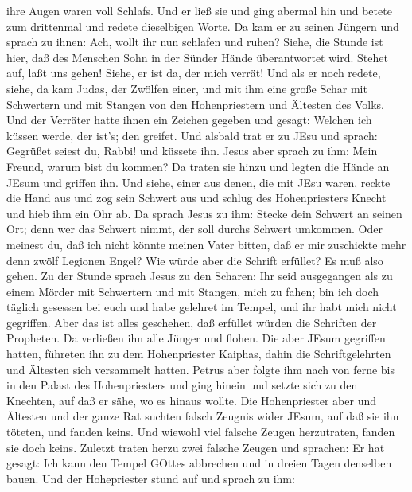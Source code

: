 ihre Augen waren voll Schlafs.  Und er ließ sie und ging
abermal hin und betete zum drittenmal und redete dieselbigen Worte.
 Da kam er zu seinen Jüngern und sprach zu ihnen: Ach,
wollt ihr nun schlafen und ruhen? Siehe, die Stunde ist hier, daß des
Menschen Sohn in der Sünder Hände überantwortet wird. 
Stehet auf, laßt uns gehen! Siehe, er ist da, der mich verrät!
 Und als er noch redete, siehe, da kam Judas, der Zwölfen
einer, und mit ihm eine große Schar mit Schwertern und mit Stangen von
den Hohenpriestern und Ältesten des Volks.  Und der
Verräter hatte ihnen ein Zeichen gegeben und gesagt: Welchen ich küssen
werde, der ist's; den greifet.  Und alsbald trat er zu JEsu
und sprach: Gegrüßet seiest du, Rabbi! und küssete ihn. 
Jesus aber sprach zu ihm: Mein Freund, warum bist du kommen? Da traten
sie hinzu und legten die Hände an JEsum und griffen ihn. 
Und siehe, einer aus denen, die mit JEsu waren, reckte die Hand aus und
zog sein Schwert aus und schlug des Hohenpriesters Knecht und hieb ihm
ein Ohr ab.  Da sprach Jesus zu ihm: Stecke dein Schwert an
seinen Ort; denn wer das Schwert nimmt, der soll durchs Schwert
umkommen.  Oder meinest du, daß ich nicht könnte meinen
Vater bitten, daß er mir zuschickte mehr denn zwölf Legionen Engel?
 Wie würde aber die Schrift erfüllet? Es muß also gehen.
 Zu der Stunde sprach Jesus zu den Scharen: Ihr seid
ausgegangen als zu einem Mörder mit Schwertern und mit Stangen, mich zu
fahen; bin ich doch täglich gesessen bei euch und habe gelehret im
Tempel, und ihr habt mich nicht gegriffen.  Aber das ist
alles geschehen, daß erfüllet würden die Schriften der Propheten. Da
verließen ihn alle Jünger und flohen.  Die aber JEsum
gegriffen hatten, führeten ihn zu dem Hohenpriester Kaiphas, dahin die
Schriftgelehrten und Ältesten sich versammelt hatten. 
Petrus aber folgte ihm nach von ferne bis in den Palast des
Hohenpriesters und ging hinein und setzte sich zu den Knechten, auf daß
er sähe, wo es hinaus wollte.  Die Hohenpriester aber und
Ältesten und der ganze Rat suchten falsch Zeugnis wider JEsum, auf daß
sie ihn töteten,  und fanden keins. Und wiewohl viel
falsche Zeugen herzutraten, fanden sie doch keins. Zuletzt traten herzu
zwei falsche Zeugen  und sprachen: Er hat gesagt: Ich kann
den Tempel GOttes abbrechen und in dreien Tagen denselben bauen.
 Und der Hohepriester stund auf und sprach zu ihm:
